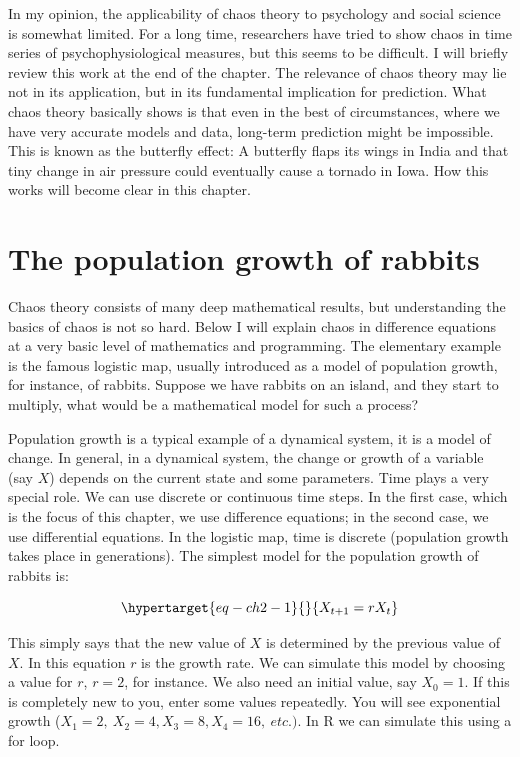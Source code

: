 \documentclass[
  a4paper,
  DIV=11,
  numbers=noendperiod,
  oneside]{scrreprt}
\begin{document}
In my opinion, the applicability of chaos theory to psychology and
social science is somewhat limited. For a long time, researchers have
tried to show chaos in time series of psychophysiological measures, but
this seems to be difficult. I will briefly review this work at the end
of the chapter. The relevance of chaos theory may lie not in its
application, but in its fundamental implication for prediction. What
chaos theory basically shows is that even in the best of circumstances,
where we have very accurate models and data, long-term prediction might
be impossible. This is known as the butterfly effect: A butterfly flaps
its wings in India and that tiny change in air pressure could eventually
cause a tornado in Iowa. How this works will become clear in this
chapter.

\hypertarget{sec-The-population-growth-of-rabbits}{%
\section{The population growth of
rabbits}\label{sec-The-population-growth-of-rabbits}}

Chaos theory consists of many deep mathematical results, but
understanding the basics of chaos is not so hard. Below I will explain
chaos in difference equations at a very basic level of mathematics and
programming. The elementary example is the famous logistic map, usually
introduced as a model of population growth, for instance, of rabbits.
Suppose we have rabbits on an island, and they start to multiply, what
would be a mathematical model for such a process?

Population growth is a typical example of a dynamical system, it is a
model of change. In general, in a dynamical system, the change or growth
of a variable (say \(X\)) depends on the current state and some
parameters. Time plays a very special role. We can use discrete or
continuous time steps. In the first case, which is the focus of this
chapter, we use difference equations; in the second case, we use
differential equations. In the logistic map, time is discrete
(population growth takes place in generations). The simplest model for
the population growth of rabbits is:

\begin{equation}\protect\hypertarget{eq-ch2-1}{}{
X_{t + 1} = rX_{t}}\label{eq-ch2-1}\end{equation}

This simply says that the new value of \(X\) is determined by the
previous value of \(X\). In this equation \(r\) is the growth rate. We
can simulate this model by choosing a value for \(r\), \(r=2\), for
instance. We also need an initial value, say \(X_{0} = 1.\) If this is
completely new to you, enter some values repeatedly. You will see
exponential growth
(\(X_{1} = 2,\ X_{2} = 4,X_{3} = 8,X_{4} = 16,\ etc.)\). In R we can
simulate this using a for loop.
\end{document}
